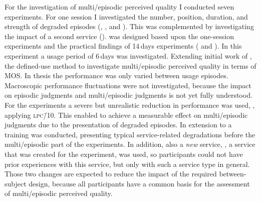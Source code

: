 For the investigation of multi\-/episodic perceived quality I conducted seven experiments.
For one session I investigated the number, position, duration, and strength of degraded episodes (, \EIIa{}, and ).
This was complemented by investigating the impact of a second service (\EIIb{}).
 was designed based upon the one-session experiments and the practical findings of 14\,days experiments ( and ).
In this experiment a usage period of 6\,days was investigated.
Extending initial work of \citet{moller_single-call_2011}, the defined-use method to investigate multi\-/episodic perceived quality in terms of \ac{MOS}.
In thesis the performance was only varied between usage episodes.
Macroscopic performance fluctuations were not investigated, because the impact on episodic judgments and multi\-/episodic judgments is not yet fully understood.
For the experiments a severe but unrealistic reduction in performance was used, \ie, applying \textsc{\lowercase{LPC\=/10}}.
This enabled to achieve a measurable effect on multi\-/episodic judgments due to the presentation of degraded episodes.
In extension to \cite{moller_single-call_2011} a training was conducted, presenting typical service-related degradations before the multi\-/episodic part of the experiments.
In addition, also a \emph{new} service, \ie, a service that was created for the experiment, was used, so participants could not have prior experiences with this service, but only with such a service type in general.
Those two changes are expected to reduce the impact of the required between-subject design, because all participants have a common basis for the assessment of multi\-/episodic perceived quality.

